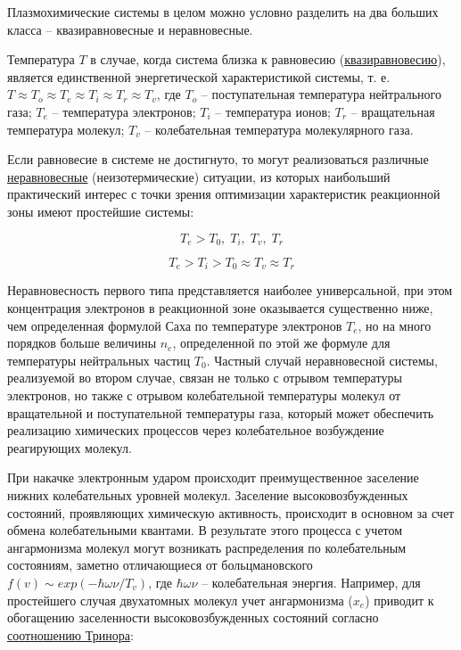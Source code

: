 \documentclass[10pt, a4paper]{article}
\begin{document}
Плазмохимические системы в целом можно условно разделить на два больших класса -- квазиравновесные и неравновесные.

Температура $T$ в случае, когда система близка к равновесию (\uline{квазиравновесию}), является единственной энергетической характеристикой системы, т. е. $T \approx T_o \approx T_e \approx T_i \approx T_r \approx T_v$, где $T_o$ -- поступательная температура нейтрального газа; $T_e$ -- температура электронов; $T_i$ -- температура ионов; $T_r$ -- вращательная температура молекул; $T_v$ -- колебательная температура молекулярного газа. 

Если равновесие в системе не достигнуто, то могут реализоваться различные \uline{неравновесные} (неизотермические) ситуации, из которых наибольший практический интерес с точки зрения оптимизации характеристик реакционной зоны имеют простейшие системы:

\begin{equation*}
	T_e > T_0,\;T_i,\;T_v,\;T_r
\end{equation*}

\begin{equation*}
	T_e > T_i > T_0 \approx T_v \approx T_r
\end{equation*}

Неравновесность первого типа представляется наиболее универсальной, при этом концентрация электронов в реакционной зоне оказывается существенно ниже, чем определенная формулой Саха по температуре электронов $T_e$, но на много порядков больше величины $n_e$, определенной по этой же формуле для температуры нейтральных частиц $T_0$. Частный случай неравновесной системы, реализуемой во втором случае, связан не только с отрывом температуры электронов, но также с отрывом колебательной температуры молекул от вращательной и поступательной температуры газа, который может обеспечить реализацию химических процессов через колебательное возбуждение реагирующих молекул. 

При накачке электронным ударом происходит преимущественное заселение нижних колебательных уровней молекул. Заселение высоковозбужденных состояний, проявляющих химическую активность, происходит в основном за счет обмена колебательными квантами. В результате этого процесса с учетом ангармонизма молекул могут возникать распределения по колебательным состояниям, заметно отличающиеся от больцмановского $f(v)\sim exp(-\hbar\omega\nu/T_v)$, где $\hbar\omega\nu$ -- колебательная энергия. Например, для простейшего случая двухатомных молекул учет ангармонизма ($x_e$) приводит к обогащению заселенности высоковозбужденных состояний согласно \uline{соотношению Тринора}:
\end{document}

